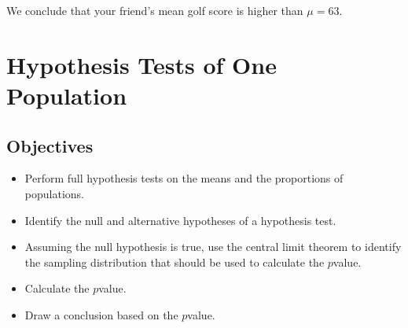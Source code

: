 \documentclass[letterpaper,10pt,english]{jupyterBook}
\begin{document}
\sphinxAtStartPar
We conclude that your friend’s mean golf score is higher than \(\mu = 63\).

\sphinxstepscope


\section{Hypothesis Tests of One Population}
\label{\detokenize{Ch6 An Introduction to Hypothesis Testing/6.4 Hypothesis Tests of One Population:hypothesis-tests-of-one-population}}\label{\detokenize{Ch6 An Introduction to Hypothesis Testing/6.4 Hypothesis Tests of One Population::doc}}

\subsection{Objectives}
\label{\detokenize{Ch6 An Introduction to Hypothesis Testing/6.4 Hypothesis Tests of One Population:objectives}}\begin{itemize}
\item {} 
\sphinxAtStartPar
Perform full hypothesis tests on the means and the proportions of populations.

\item {} 
\sphinxAtStartPar
Identify the null and alternative hypotheses of a hypothesis test.

\item {} 
\sphinxAtStartPar
Assuming the null hypothesis is true, use the central limit theorem to identify the sampling distribution that should be used to calculate the \(p\)\sphinxhyphen{}value.

\item {} 
\sphinxAtStartPar
Calculate the \(p\)\sphinxhyphen{}value.

\item {} 
\sphinxAtStartPar
Draw a conclusion based on the \(p\)\sphinxhyphen{}value.

\end{itemize}
\end{document}
